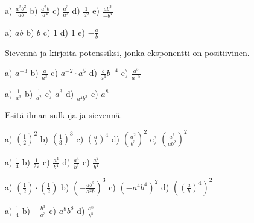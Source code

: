     \begin{tehtava}
        a) $\frac{a^2b^2}{ab}$ \qquad
        b) $\frac{a^2b}{a^2}$ \qquad
        c) $\frac{a^3}{a^3}$ \qquad
        d) $\frac{1}{a^0}$ \qquad
        e) $\frac{ab^3}{-b^4}$
        
        \begin{vastaus}
            a) $ab$ \qquad
            b) $b$ \qquad
            c) $1$ \qquad
            d) $1$ \qquad
            e) $-\frac{a}{b}$
        \end{vastaus}
    \end{tehtava}
    
    Sievennä ja kirjoita potenssiksi, jonka eksponentti on positiivinen.
    
    \begin{tehtava}
        a) $a^{-3}$ \qquad
        b) $\frac{a}{a^3}$ \qquad
        c) $a^{-2}\cdot a^5$ \qquad
        d) $\frac{b}{a^4}b^{-4}$ \qquad
        e) $\frac{a^3}{a^{-5}}$
        
        \begin{vastaus}
            a) $\frac{1}{a^3}$ \qquad
            b) $\frac{1}{a^2}$ \qquad
            c) $a^3$ \qquad
            d) $\frac{}{a^4b^3}$ \qquad
            e) $a^8$
        \end{vastaus}
    \end{tehtava}
    
    Esitä ilman sulkuja ja sievennä.
    
    \begin{tehtava}
        a) $(\frac{1}{2})^2$ \qquad
        b) $(\frac{1}{3})^3$ \qquad
        c) $(\frac{a}{b})^4$ \qquad
        d) $(\frac{a^2}{b^3})^2$ \qquad
        e) $\left(\frac{a^2}{ab^2}\right)^2$
        
        \begin{vastaus}
            a) $\frac{1}{4}$ \qquad
            b) $\frac{1}{27}$ \qquad
            c) $\frac{a^4}{b^4}$ \qquad
            d) $\frac{a^4}{b^6}$ \qquad
            e) $\frac{a^2}{b^4}$
        \end{vastaus}
    \end{tehtava}
    
    \begin{tehtava}
        a) $(\frac{1}{2})\cdot(\frac{1}{2})$ \qquad
        b) $(-\frac{ab^2}{a^2b})^3$ \qquad
        c) $(-a^4b^4)^2$ \qquad
        d) $\left((\frac{a}{b})^4\right)^2$
        
        \begin{vastaus}
            a) $\frac{1}{4}$ \qquad
            b) $-\frac{b^3}{a^3}$ \qquad
            c) $a^8b^8$ \qquad
            d) $\frac{a^8}{b^8}$
        \end{vastaus}
    \end{tehtava}
    
